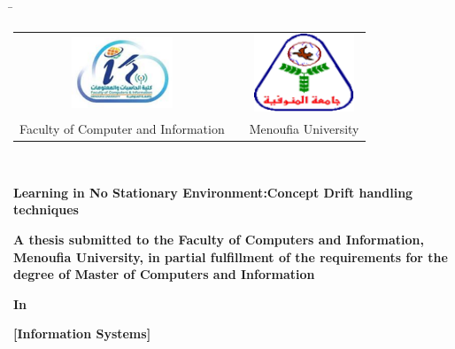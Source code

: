 

\begin{titlepage}
    \begin{tabbing}
        \hspace{1cm} %
        \= \kill %
        \begin{tabular}{ccc} %
          \includegraphics[width=3cm]{0_frontmatter/figures/PNG/faculty_image.png} & \hspace{2.5cm} & \includegraphics[width=3cm]{0_frontmatter/figures/PNG/menoufia_logo.png} \\
          \multicolumn{1}{l}{Faculty of Computer and Information} & \hspace{2.5cm}  & \multicolumn{1}{l}{Menoufia  University} \\
        \end{tabular}\\
    \end{tabbing}
    \begin{center}
        \vspace{0.5cm}

        \textbf{\Huge \normalfont Learning in No Stationary Environment:Concept Drift handling techniques} 
        \vspace{0.6cm}
        
        \textbf{\large \normalfont A thesis submitted to the Faculty of Computers and Information, Menoufia University, in partial fulfillment of the requirements for the degree of Master of Computers and Information} \\
        \vspace{0.4cm}
        
        \textbf{\large In} \\
        \vspace{0.3cm}
        
        \textbf{\Large [Information Systems]} \\
        \vspace{0.6cm}
        

\end{center}
\end{titlepage}
